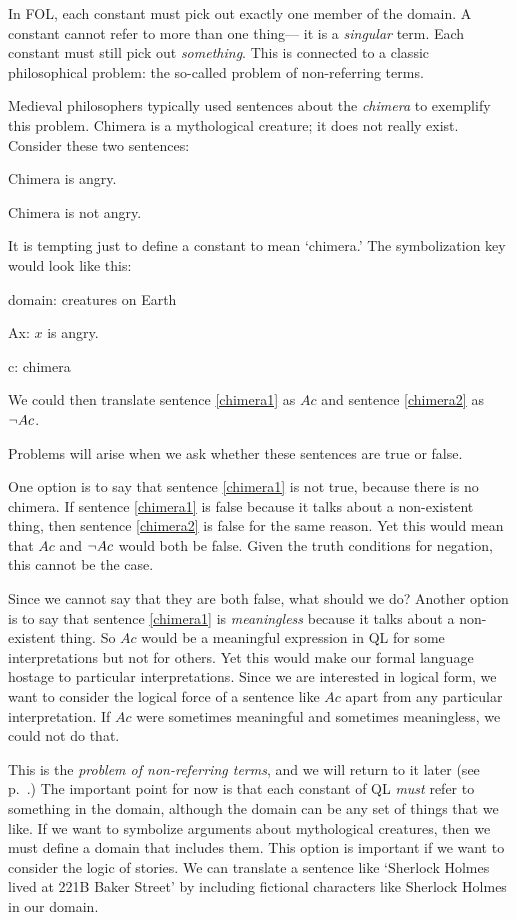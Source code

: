 In FOL, each constant must pick out exactly one member of the domain. A constant cannot refer to more than one thing--- it is a \emph{singular} term. Each constant must still pick out \emph{something}. This is connected to a classic philosophical problem: the so-called problem of non-referring terms.

Medieval philosophers typically used sentences about the \emph{chimera} to exemplify this problem. Chimera is a mythological creature; it does not really exist. Consider these two sentences:
\begin{earg}
\item[\ex{chimera1}] Chimera is angry.
\item[\ex{chimera2}] Chimera is not angry.
\end{earg}
It is tempting just to define a constant to mean `chimera.' The symbolization key would look like this:
\begin{ekey}
\item[domain:] creatures on Earth
\item[Ax:] $x$ is angry.
\item[c:] chimera
\end{ekey}
We could then translate sentence \ref{chimera1} as $Ac$ and sentence \ref{chimera2} as $\neg Ac$.

Problems will arise when we ask whether these sentences are true or false.

One option is to say that sentence \ref{chimera1} is not true, because there is no chimera. If sentence \ref{chimera1} is false because it talks about a non-existent thing, then sentence \ref{chimera2} is false for the same reason. Yet this would mean that $Ac$ and $\neg Ac$ would both be false. Given the truth conditions for negation, this cannot be the case.

Since we cannot say that they are both false, what should we do? Another option is to say that sentence \ref{chimera1} is \emph{meaningless} because it talks about a non-existent thing. So $Ac$ would be a meaningful expression in QL for some interpretations but not for others. Yet this would make our formal language hostage to particular interpretations. Since we are interested in logical form, we want to consider the logical force of a sentence like $Ac$ apart from any particular interpretation. If $Ac$ were sometimes meaningful and sometimes meaningless, we could not do that.

This is the \emph{problem of non-referring terms}, and we will return to it later (see p.~\pageref{subsec.defdesc}.) The important point for now is that each constant of QL \emph{must} refer to something in the domain, although the domain can be any set of things that we like. If we want to symbolize arguments about mythological creatures, then we must define a domain that includes them. This option is important if we want to consider the logic of stories. We can translate a sentence like `Sherlock Holmes lived at 221B Baker Street' by including fictional characters like Sherlock Holmes in our domain.

